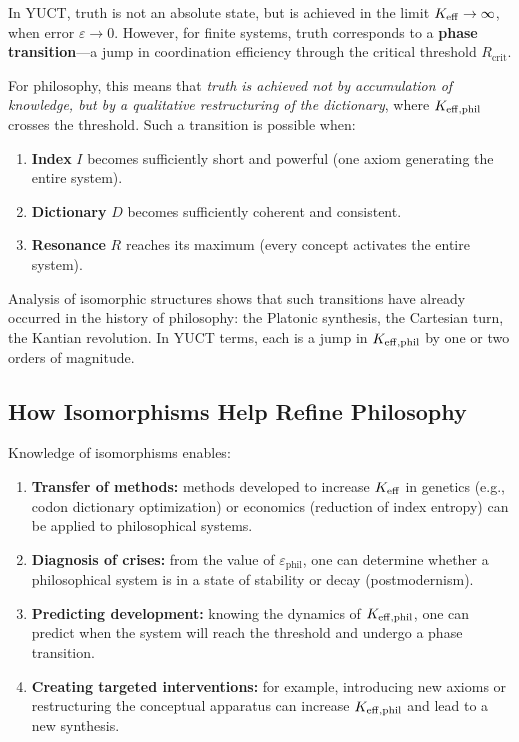 \documentclass[12pt,a4paper]{article}
\newcommand{\eps}{\varepsilon}
\newcommand{\Rcrit}{R_{\mathrm{crit}}}
\begin{document}
	In YUCT, truth is not an absolute state, but is achieved in the limit \(\Keff \to \infty\), when error \(\eps \to 0\). However, for finite systems, truth corresponds to a \textbf{phase transition}—a jump in coordination efficiency through the critical threshold \(\Rcrit\).
	
	For philosophy, this means that \emph{truth is achieved not by accumulation of knowledge, but by a qualitative restructuring of the dictionary}, where \(\Keff[\text{phil}]\) crosses the threshold. Such a transition is possible when:
	
	\begin{enumerate}
		\item \textbf{Index} \(I\) becomes sufficiently short and powerful (one axiom generating the entire system).
		\item \textbf{Dictionary} \(D\) becomes sufficiently coherent and consistent.
		\item \textbf{Resonance} \(R\) reaches its maximum (every concept activates the entire system).
	\end{enumerate}
	
	Analysis of isomorphic structures shows that such transitions have already occurred in the history of philosophy: the Platonic synthesis, the Cartesian turn, the Kantian revolution. In YUCT terms, each is a jump in \(\Keff[\text{phil}]\) by one or two orders of magnitude.
	
	\subsection{How Isomorphisms Help Refine Philosophy}
	
	Knowledge of isomorphisms enables:
	
	\begin{enumerate}
		\item \textbf{Transfer of methods:} methods developed to increase \(\Keff\) in genetics (e.g., codon dictionary optimization) or economics (reduction of index entropy) can be applied to philosophical systems.
		\item \textbf{Diagnosis of crises:} from the value of \(\eps_{\text{phil}}\), one can determine whether a philosophical system is in a state of stability or decay (postmodernism).
		\item \textbf{Predicting development:} knowing the dynamics of \(\Keff[\text{phil}]\), one can predict when the system will reach the threshold and undergo a phase transition.
		\item \textbf{Creating targeted interventions:} for example, introducing new axioms or restructuring the conceptual apparatus can increase \(\Keff[\text{phil}]\) and lead to a new synthesis.
	\end{enumerate}
	
\end{document}
